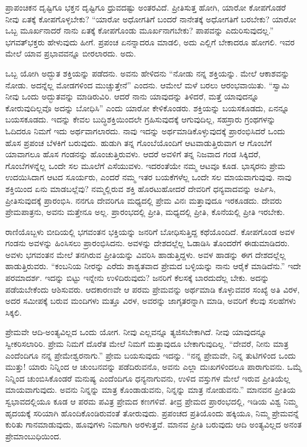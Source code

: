 ಪ್ರಾಪಂಚಿಕನ ದೃಷ್ಟಿಗೂ ಭಕ್ತನ ದೃಷ್ಟಿಗೂ ಧ್ರುವದಷ್ಟು ಅಂತರವಿದೆ. ಪ್ರೀತಿಸುತ್ತ ಹೋಗಿ, ಯಾರೋ ಕೋಪಗೊಡರೆ ನೀವು ಏತಕ್ಕೆ ಕೋಪಗೊಳ್ಳಬೇಕು? “ಯಾರೋ ಅಧೋಗತಿಗೆ ಬಂದರೆ ನಾನೇತಕ್ಕೆ ಅಧೋಗತಿಗೆ ಬರಬೇಕು? ಯಾರೋ ಒಬ್ಬ ಮೂರ್ಖನಾದರೆ ನಾನು ಏತಕ್ಕೆ ಕೋಪಗೊಂಡು ಮೂರ್ಖನಾಗಬೇಕು? ಪಾಪವನ್ನು ಎದುರಿಸುವುದಲ್ಲ.” ಭಗವತ್‌ಭಕ್ತರು ಹೇಳುವುದು ಹೀಗೆ. ಪ್ರಪಂಚ ಏನನ್ನಾದರೂ ಮಾಡಲಿ, ಅದು ಎಲ್ಲಿಗೆ ಬೇಕಾದರೂ ಹೋಗಲಿ. ಇವರ ಮೇಲೆ ಯಾವ ಪ್ರಭಾವವನ್ನೂ ಬೀರಲಾರದು. ಅದು.

\newpage

ಒಬ್ಬ ಯೋಗಿ ಅದ್ಭುತ ಶಕ್ತಿಯನ್ನು ಪಡೆದನು. ಅವನು ಹೇಳಿದನು “ನೋಡು ನನ್ನ ಶಕ್ತಿಯನ್ನು. ಮೇಲೆ ಆಕಾಶವನ್ನು ನೋಡು. ಅದನ್ನೆಲ್ಲ ಮೋಡಗಳಿಂದ ಮುಚ್ಚುತ್ತೇನೆ'' ಎಂದನು. ಆಮೇಲೆ ಮಳೆ ಬರಲು ಆರಂಭವಾಯಿತು. “ಸ್ವಾಮಿ ನೀವು ಒಂದು ಅದ್ಭುತವನ್ನು ಮಾಡಿರುವಿರಿ. ಆದರೆ ನಾನು ಯಾವುದನ್ನು ತಿಳಿದರೆ, ಮತ್ತೆ ಯಾವುದನ್ನೂ ಕೋರುವುದಿಲ್ಲವೊ ಅದನ್ನು ಬೋಧಿಸಿ'' ಎಂದು ಯಾರೋ ಕೇಳಿಕೊಂಡರು. ಶಕ್ತಿಯನ್ನು ಬಯಸಕೂಡದು, ಏನನ್ನೂ ಬಯಸಕೂಡದು. ಇದನ್ನು ಕೇವಲ ಬುದ್ಧಿಶಕ್ತಿಯಿಂದಲೇ ಗ್ರಹಿಸುವುದಕ್ಕೆ ಆಗುವುದಿಲ್ಲ, ಸಹಸ್ರಾರು ಗ್ರಂಥಗಳನ್ನು ಓದಿದರೂ ನಿಮಗೆ ಇದು ಅರ್ಥವಾಗಲಾರದು. ನಾವು ಇದನ್ನು ಅರ್ಥಮಾಡಿಕೊಳ್ಳುವುದಕ್ಕೆ ಪ್ರಾರಂಭಿಸಿದರೆ ಒಂದು ಹೊಸ ಪ್ರಪಂಚ ಬೆಳಕಿಗೆ ಬರುವುದು. ಹುಡುಗಿ ತನ್ನ ಗೊಂಬೆಯೊಂದಿಗೆ ಆಟವಾಡುತ್ತಿರುವಾಗ ಆ ಗೊಂಬೆಗೆ ಯಾವಾಗಲೂ ಹೊಸ ಗಂಡನನ್ನು ಹೊಂಚುತ್ತಿರುವಳು. ಆದರೆ ಅವಳಿಗೆ ತನ್ನ ನಿಜವಾದ ಗಂಡ ಸಿಕ್ಕಿದರೆ, ಗೊಂಬೆಗಳನ್ನೆಲ್ಲ ಒಂದೇ ಸಲ ಮೂಲೆಗೆ ಎಸೆಯುವಳು. ಇದರಂತೆಯೇ ನಮ್ಮ ಆಟವೂ ಕೂಡ. ಭಾಸ್ಕರನು ಪ್ರೇಮ ಉದಯಿಸಿದಾಗ ಆಟದ ಸೂರ್ಯರು, ಎಂದರೆ ನಮ್ಮ ಇತರ ಬಯಕೆಗಳೆಲ್ಲ ಒಂದೇ ಸಲ ಮಾಯವಾಗುವುವು. ನಾವು ಶಕ್ತಿಯಿಂದ ಏನು ಮಾಡಬಲ್ಲೆವು? ನಮ್ಮಲ್ಲಿರುವ ಶಕ್ತಿ ಹೊರಟುಹೋದರೆ ದೇವರಿಗೆ ಧನ್ಯವಾದವನ್ನು ಅರ್ಪಿಸಿ, ಪ್ರೀತಿಸುವುದಕ್ಕೆ ಪ್ರಾರಂಭಿಸಿ. ನನಗೂ ದೇವರಿಗೂ ಮಧ್ಯದಲ್ಲಿ ಪ್ರೇಮ ವಿನಃ ಮತ್ತಾವುದೂ ಇರಕೂಡದು. ದೇವರು ಪ್ರೇಮಪಾತ್ರನು, ಅವನು ಮತ್ತೇನೂ ಅಲ್ಲ. ಪ್ರಾರಂಭದಲ್ಲಿ ಪ್ರೀತಿ, ಮಧ್ಯದಲ್ಲಿ ಪ್ರೀತಿ, ಕೊನೆಯಲ್ಲಿ ಪ್ರೀತಿ ಇರಬೇಕು.

ರಾಣಿಯೊಬ್ಬಳು ಬೀದಿಯಲ್ಲಿ ಭಗವಂತನ ಭಕ್ತಿಯನ್ನು ಜನರಿಗೆ ಬೋಧಿಸುತ್ತಿದ್ದ ಕಥೆಯೊಂದಿದೆ. ಕೋಪಗೊಂಡ ಅವಳ ಗಂಡನು ಅವಳನ್ನು ಹಿಂಸಿಸಲು ಪ್ರಾರಂಭಿಸಿದನು. ಅವಳನ್ನು ದೇಶದಲ್ಲೆಲ್ಲ ಓಡಾಡಿಸಿ ತೊಂದರೆಗೆ ಈಡುಮಾಡಿದರು. ಅವಳು ಭಗವಂತನ ಮೇಲೆ ತನಗಿರುವ ಪ್ರೀತಿಯನ್ನು ವಿವರಿಸಿ ಹಾಡುತ್ತಿದ್ದಳು. ಅವಳ ಹಾಡನ್ನು ಈಗ ದೇಶದಲ್ಲೆಲ್ಲ ಹಾಡುತ್ತಿರುವರು. “ಕಂಬನಿಯ ನೀರನ್ನು ಎರೆದು ಶಾಶ್ವತವಾದ ಪ್ರೇಮದ ಬಳ್ಳಿಯನ್ನು ನಾನು ಆರೈಕೆ ಮಾಡಿದೆನು.” ಇದೇ ಪರಮಾದರ್ಶ. ಇದನ್ನು ಬಿಟ್ಟು ಇನ್ನೇನು ಉಳಿದಿರುವುದು? ಜನರಿಗೆ ಕೆಲಸಕ್ಕೆ ಬಾರದುದೆಲ್ಲ ಬೇಕು. ಅದನ್ನು ಪಡೆಯಬೇಕೆಂದು ಆಶಿಸುವರು. ಆದಕಾರಣವೇ ಆ ಪರಮ ಪ್ರೇಮವನ್ನು ಅರ್ಥಮಾಡಿ ಕೊಳ್ಳುವವರ ಸಂಖ್ಯೆ ಅತಿ ವಿರಳ, ಅದರ ಸಮೀಪಕ್ಕೆ ಬರುವ ಮಂದಿಗಳು ಮತ್ತೂ ವಿರಳ, ಅವರನ್ನು ಜಾಗೃತರನ್ನಾಗಿ ಮಾಡಿ, ಅವರಿಗೆ ಕೆಲವು ಸಲಹೆಗಳು ಸಿಕ್ಕಲಿ.

ಪ್ರೇಮವೇ ಆದಿ-ಅಂತ್ಯವಿಲ್ಲದ ಒಂದು ಯೋಗ. ನೀವು ಎಲ್ಲವನ್ನೂ ತ್ಯಜಿಸಬೇಕಾಗಿದೆ. ನೀವು ಯಾವುದನ್ನೂ ಸ್ವೀಕರಿಸಲಾರಿರಿ. ಪ್ರೇಮ ನಿಮಗೆ ದೊರೆತ ಮೇಲೆ ನಿಮಗೆ ಮತ್ತಾವುದೂ ಬೇಕಾಗುವುದಿಲ್ಲ. “ದೇವರೆ, ನೀನು ಮಾತ್ರ ಎಂದೆಂದಿಗೂ ನನ್ನ ಪ್ರೇಮೇಶ್ವರನಾಗು.” ಪ್ರೇಮ ಬಯಸುವುದು ಇದನ್ನು. “ನನ್ನ ಪ್ರೇಮವೇ, ನಿನ್ನ ತುಟಿಗಳಿಂದ ಒಂದು ಮುತ್ತು! ಯಾರು ನಿನ್ನಿಂದ ಆ ಚುಂಬನವನ್ನು ಪಡೆದಿರುವನೊ, ಅವನು ಎಲ್ಲಾ ದುಃಖಗಳಿಂದಲೂ ಪಾರಾಗುವನು. ಒಮ್ಮೆ ನಿನ್ನಿಂದ ಚುಂಬಿಸಿಕೊಂಡರೆ ಮನುಷ್ಯ ಎಂದೆಂದಿಗೂ ಧನ್ಯನಾಗುವನು, ಉಳಿದ ವಸ್ತುಗಳ ಮೇಲೆ ಇರುವ ಪ್ರೀತಿಯೆಲ್ಲ ಮಾಯವಾಗುವುದು. ಅವನು ನಿನ್ನನ್ನು ಮಾತ್ರ ಕೊಂಡಾಡುವನು, ನಿನ್ನನ್ನು ಮಾತ್ರ ನೋಡುವನು.” ಮಾನವನ ಪ್ರೀತಿಯ ಸ್ವಭಾವದಲ್ಲಿಯೂ ಕೂಡ ಆ ಪರಮ ಪವಿತ್ರ ಪ್ರೇಮದ ಕಣಗಳಿವೆ. ತೀವ್ರ ಪ್ರೇಮದ ಪ್ರಾರಂಭದಲ್ಲಿ, ಇಡಿಯ ವಿಶ್ವ ನಿಮ್ಮ ಹೃದಯಕ್ಕೆ ಸರಿಯಾಗಿ ಹೊಂದಿಕೊಂಡಿರುವಂತೆ ತೋರುವುದು. ಪ್ರಪಂಚದ ಪ್ರತಿಯೊಂದು ಹಕ್ಕಿಯೂ, ನಿಮ್ಮ ಪ್ರೇಮವನ್ನೆ ಕುರಿತು ಗಾನಮಾಡುವುದು, ಹೂವುಗಳು ನಿಮಗಾಗಿ ಅರಳುತ್ತವೆ. ಮಾನವ ಪ್ರೀತಿ ಬರುವುದು ಆದಿ ಅಂತ್ಯವಿಲ್ಲದ ಅನಂತ ಪ್ರೇಮಾಂಬುಧಿಯಿಂದ.


